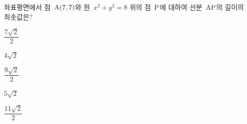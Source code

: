 좌표평면에서 점~$\mathrm{A}(7{,}\mkern3mu 7)$와 원~$x^2+y^2=8$ 위의 점~$\mathrm{P}$에 대하여 선분~$\mathrm{AP}$의 길이의 최솟값은?
\begin{choices32}{\rule[-3ex]{0pt}{8ex}$\dfrac{7\sqrt{2}}{2}$}{\rule[-3ex]{0pt}{8ex}$4\sqrt{2}$}{\rule[-3ex]{0pt}{8ex}$\dfrac{9\sqrt{2}}{2}$}{\rule[-3ex]{0pt}{8ex}$5\sqrt{2}$}{\rule[-3ex]{0pt}{8ex}$\dfrac{11\sqrt{2}}{2}$}\end{choices32}
